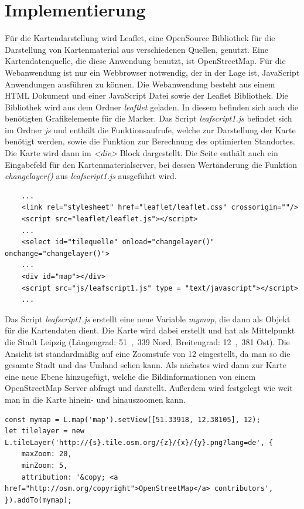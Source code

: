 \documentclass[a4paper, twoside, 12pt]{scrreprt}
\begin{document}
\chapter{Implementierung}
Für die Kartendarstellung wird Leaflet\cite{crickard2014leaflet}, eine OpenSource Bibliothek für die Darstellung von Kartenmaterial aus verschiedenen Quellen, genutzt.
Eine Kartendatenquelle, die diese Anwendung benutzt, ist OpenStreetMap.
Für die Webanwendung ist nur ein Webbrowser notwendig, der in der Lage ist, JavaScript Anwendungen ausführen zu können.
Die Webanwendung besteht aus einem HTML Dokument und einer JavaScript Datei sowie der Leaflet Bibliothek.
Die Bibliothek wird aus dem Ordner \textit{leaftlet} geladen.
In diesem befinden sich auch die benötigten Grafikelemente für die Marker.
Das Script \textit{leafscript1.js} befindet sich im Ordner \textit{js} und enthält die Funktionsaufrufe, welche zur Darstellung der Karte benötigt werden, sowie die Funktion zur Berechnung des optimierten Standortes.
Die Karte wird dann im \textit{<div>} Block dargestellt.
Die Seite enthält auch ein Eingabefeld für den Kartenmaterialserver, bei dessen Wertänderung die Funktion \textit{changelayer()} aus \textit{leafscript1.js} ausgeführt wird.
\begin{lstlisting}
	...
	<link rel="stylesheet" href="leaflet/leaflet.css" crossorigin=""/>
	<script src="leaflet/leaflet.js"></script>
	...
	<select id="tilequelle" onload="changelayer()" onchange="changelayer()">
	...
	<div id="map"></div>
	<script src="js/leafscript1.js" type = "text/javascript"></script>
	...
\end{lstlisting}
Das Script \textit{leafscript1.js} erstellt eine neue Variable \textit{mymap}, die dann als Objekt für die Kartendaten dient.
Die Karte wird dabei erstellt und hat als Mittelpunkt die Stadt Leipzig (Längengrad: \si{51{,}339}{\textdegree}  Nord, Breitengrad: \si{12{,}381}{\textdegree}  Ost). Die Ansicht ist standardmäßig auf eine Zoomstufe von 12 eingestellt, da man so die gesamte Stadt und das Umland sehen kann.
Als nächstes wird dann zur Karte eine neue Ebene hinzugefügt, welche die Bildinformationen von einem OpenStreetMap Server abfragt und darstellt.
Außerdem wird festgelegt wie weit man in die Karte hinein- und hinauszoomen kann.
\lstset{language=Java}
\begin{lstlisting}
const mymap = L.map('map').setView([51.33918, 12.38105], 12);
let tilelayer = new L.tileLayer('http://{s}.tile.osm.org/{z}/{x}/{y}.png?lang=de', {
	maxZoom: 20,
	minZoom: 5,
	attribution: '&copy; <a href="http://osm.org/copyright">OpenStreetMap</a> contributors',
}).addTo(mymap);
\end{lstlisting}
\end{document}
